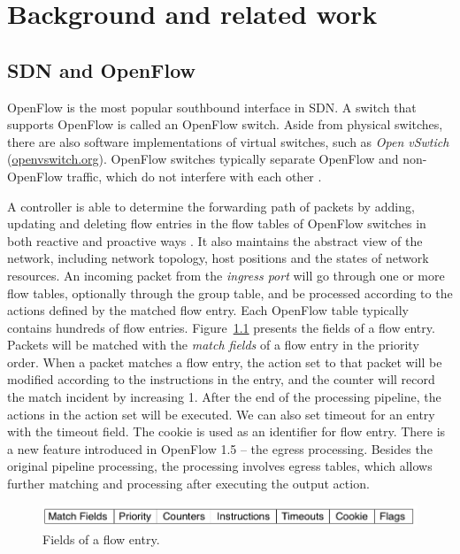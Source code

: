 \chapter{Background and related work}
\section{SDN and OpenFlow}
\label{SDN and OpenFlow}
OpenFlow is the most popular southbound interface in SDN. A switch that supports OpenFlow is called an OpenFlow switch. Aside from physical switches, there are also software implementations of virtual switches, such as \textit{Open vSwtich} (\url{openvswitch.org}). OpenFlow switches typically separate OpenFlow and non-OpenFlow traffic, which do not interfere with each other \cite{HP_SPEC}.

A controller is able to determine the forwarding path of packets by adding, updating and deleting flow entries in the flow tables of OpenFlow switches in both reactive and proactive ways \cite{OF_SPEC}. It also maintains the abstract view of the network, including network topology, host positions and the states of network resources. An incoming packet from the \textit{ingress port} will go through one or more flow tables, optionally through the group table, and be processed according to the actions defined by the matched flow entry. Each OpenFlow table typically contains hundreds of flow entries. Figure~\ref{FE_Col} presents the fields of a flow entry. Packets will be matched with the \textit{match fields} of a flow entry in the priority order. When a packet matches a flow entry, the action set to that packet will be modified according to the instructions in the entry, and the counter will record the match incident by increasing 1. After the end of the processing pipeline, the actions in the action set will be executed. We can also set timeout for an entry with the timeout field. The cookie is used as an identifier for flow entry. There is a new feature introduced in OpenFlow 1.5 -- the egress processing. Besides the original pipeline processing, the processing involves egress tables, which allows further matching and processing after executing the output action\cite{OF_SPEC}. 

\begin{figure}[H]
\begin{center} 
\includegraphics[width=1\textwidth]{figures/columns_of_flow_entry.png}
\end{center}
\caption{Fields of a flow entry.}
\label{FE_Col}
\end{figure}

